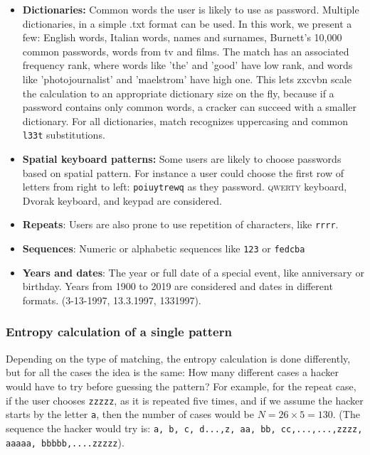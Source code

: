 \begin{itemize}
\setlength\itemsep{-3pt}


\item \textbf{Dictionaries:} Common words the user is likely to use as password. Multiple dictionaries, in a simple .txt format can be used. In this work, we present a few: English words, Italian words, names and surnames, Burnett’s 10,000 common passwords, words from tv and films. The match has an associated frequency rank, where words like 'the' and 'good' have low rank, and words like 'photojournalist' and 'maelstrom' have high one. This lets zxcvbn scale the calculation to an appropriate dictionary size on the fly, because if a password contains only common words, a cracker can succeed with a smaller dictionary. For all dictionaries, match recognizes uppercasing and common \texttt{l33t} substitutions.

\item \textbf{Spatial keyboard patterns:} Some users are likely to choose passwords based on spatial pattern. For instance a user could choose the first row of letters from right to left: \texttt{poiuytrewq} as they password. \textsc{qwerty} keyboard, Dvorak keyboard, and keypad are considered.

\item \textbf{Repeats}: Users are also prone to use repetition of characters, like \texttt{rrrr}. 

\item \textbf{Sequences}: Numeric or alphabetic sequences like \texttt{123} or \texttt{fedcba}

\item \textbf{Years and dates}: The year or full date of a special event, like anniversary or birthday. Years from 1900 to 2019 are considered and dates in different formats. (3-13-1997, 13.3.1997, 1331997). 

\end{itemize}

\subsubsection*{Entropy calculation of a single pattern}
Depending on the type of matching, the entropy calculation is done differently, but for all the cases the idea is the same: How many different cases a hacker would have to try before guessing the pattern? For example, for the repeat case, if the user chooses \texttt{zzzzz}, as it is repeated five times, and if we assume the hacker starts by the letter \texttt{a}, then the number of cases would be $ N = 26 \times 5 = 130 $. (The sequence the hacker would try is: \texttt{a, b, c, d...,z, aa, bb, cc,...,...,zzzz, aaaaa, bbbbb,....zzzzz}).


